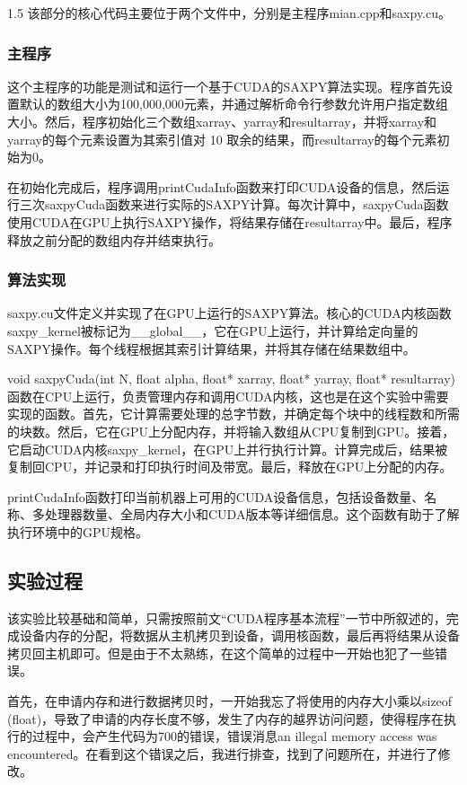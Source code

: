 \documentclass[zihao=-4]{ctexart}
\begin{document}
\begin{spacing}{1.5}
该部分的核心代码主要位于两个文件中，分别是主程序mian.cpp和saxpy.cu。

\subsubsection{主程序}

这个主程序的功能是测试和运行一个基于CUDA的SAXPY算法实现。程序首先设置默认的数组大小为100,000,000元素，并通过解析命令行参数允许用户指定数组大小。然后，程序初始化三个数组xarray、yarray和resultarray，并将xarray和yarray的每个元素设置为其索引值对 10 取余的结果，而resultarray的每个元素初始为0。

在初始化完成后，程序调用printCudaInfo函数来打印CUDA设备的信息，然后运行三次saxpyCuda函数来进行实际的SAXPY计算。每次计算中，saxpyCuda函数使用CUDA在GPU上执行SAXPY操作，将结果存储在resultarray中。最后，程序释放之前分配的数组内存并结束执行。

\subsubsection{算法实现}

saxpy.cu文件定义并实现了在GPU上运行的SAXPY算法。核心的CUDA内核函数saxpy\_kernel被标记为\_\_global\_\_，它在GPU上运行，并计算给定向量的SAXPY操作。每个线程根据其索引计算结果，并将其存储在结果数组中。

void saxpyCuda(int N, float alpha, float* xarray, float* yarray, float* resultarray)函数在CPU上运行，负责管理内存和调用CUDA内核，这也是在这个实验中需要实现的函数。首先，它计算需要处理的总字节数，并确定每个块中的线程数和所需的块数。然后，它在GPU上分配内存，并将输入数组从CPU复制到GPU。接着，它启动CUDA内核saxpy\_kernel，在GPU上并行执行计算。计算完成后，结果被复制回CPU，并记录和打印执行时间及带宽。最后，释放在GPU上分配的内存。

printCudaInfo函数打印当前机器上可用的CUDA设备信息，包括设备数量、名称、多处理器数量、全局内存大小和CUDA版本等详细信息。这个函数有助于了解执行环境中的GPU规格。

\subsection{实验过程}

该实验比较基础和简单，只需按照前文“CUDA程序基本流程”一节中所叙述的，完成设备内存的分配，将数据从主机拷贝到设备，调用核函数，最后再将结果从设备拷贝回主机即可。但是由于不太熟练，在这个简单的过程中一开始也犯了一些错误。

首先，在申请内存和进行数据拷贝时，一开始我忘了将使用的内存大小乘以sizeof (float)，导致了申请的内存长度不够，发生了内存的越界访问问题，使得程序在执行的过程中，会产生代码为700的错误，错误消息an illegal memory access was encountered。在看到这个错误之后，我进行排查，找到了问题所在，并进行了修改。


\end{spacing}
\end{document}
